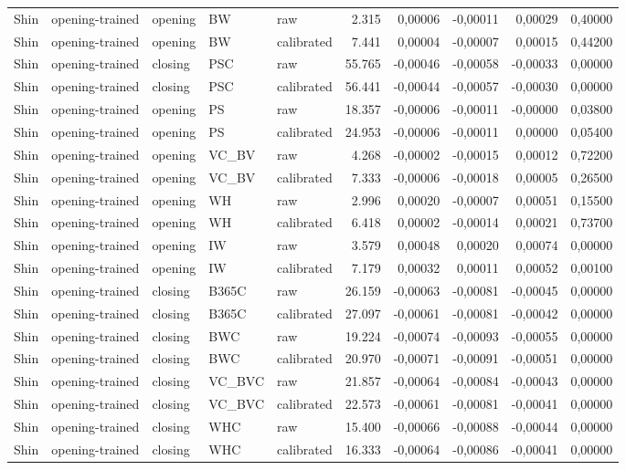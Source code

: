 {\begin{longtable}{@{}lllllrrrrr@{}}
Shin & opening-trained & opening & BW & raw & 2.315 & 0,00006 & -0,00011 & 0,00029 & 0,40000 \\
Shin & opening-trained & opening & BW & calibrated & 7.441 & 0,00004 & -0,00007 & 0,00015 & 0,44200 \\
Shin & opening-trained & closing & PSC & raw & 55.765 & -0,00046 & -0,00058 & -0,00033 & 0,00000 \\
Shin & opening-trained & closing & PSC & calibrated & 56.441 & -0,00044 & -0,00057 & -0,00030 & 0,00000 \\
Shin & opening-trained & opening & PS & raw & 18.357 & -0,00006 & -0,00011 & -0,00000 & 0,03800 \\
Shin & opening-trained & opening & PS & calibrated & 24.953 & -0,00006 & -0,00011 & 0,00000 & 0,05400 \\
Shin & opening-trained & opening & VC\_BV & raw & 4.268 & -0,00002 & -0,00015 & 0,00012 & 0,72200 \\
Shin & opening-trained & opening & VC\_BV & calibrated & 7.333 & -0,00006 & -0,00018 & 0,00005 & 0,26500 \\
Shin & opening-trained & opening & WH & raw & 2.996 & 0,00020 & -0,00007 & 0,00051 & 0,15500 \\
Shin & opening-trained & opening & WH & calibrated & 6.418 & 0,00002 & -0,00014 & 0,00021 & 0,73700 \\
Shin & opening-trained & opening & IW & raw & 3.579 & 0,00048 & 0,00020 & 0,00074 & 0,00000 \\
Shin & opening-trained & opening & IW & calibrated & 7.179 & 0,00032 & 0,00011 & 0,00052 & 0,00100 \\
Shin & opening-trained & closing & B365C & raw & 26.159 & -0,00063 & -0,00081 & -0,00045 & 0,00000 \\
Shin & opening-trained & closing & B365C & calibrated & 27.097 & -0,00061 & -0,00081 & -0,00042 & 0,00000 \\
Shin & opening-trained & closing & BWC & raw & 19.224 & -0,00074 & -0,00093 & -0,00055 & 0,00000 \\
Shin & opening-trained & closing & BWC & calibrated & 20.970 & -0,00071 & -0,00091 & -0,00051 & 0,00000 \\
Shin & opening-trained & closing & VC\_BVC & raw & 21.857 & -0,00064 & -0,00084 & -0,00043 & 0,00000 \\
Shin & opening-trained & closing & VC\_BVC & calibrated & 22.573 & -0,00061 & -0,00081 & -0,00041 & 0,00000 \\
Shin & opening-trained & closing & WHC & raw & 15.400 & -0,00066 & -0,00088 & -0,00044 & 0,00000 \\
Shin & opening-trained & closing & WHC & calibrated & 16.333 & -0,00064 & -0,00086 & -0,00041 & 0,00000 \\
\end{longtable}
}

